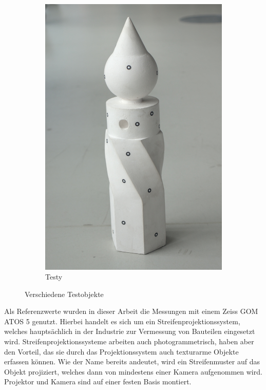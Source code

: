 \documentclass[./00PhotoBox.tex]{subfiles}
\begin{document}
\begin{figure}
\begin{subfigure}{0.32\textwidth}
        \includegraphics[width=1\textwidth]{img/7_versuche/bild_testy.jpg}
        \caption{Testy}
        \label{img:bild_testy}
    \end{subfigure}
    \caption{Verschiedene Testobjekte}
    \label{img:bilder_testobjekte}
\end{figure}

Als Referenzwerte wurden in dieser Arbeit die Messungen mit einem Zeiss GOM ATOS 5 genutzt. Hierbei handelt es sich um ein Streifenprojektionssystem, welches hauptsächlich in der Industrie zur Vermessung von Bauteilen eingesetzt wird. Streifenprojektionssysteme arbeiten auch photogrammetrisch, haben aber den Vorteil, das sie durch das Projektionssystem auch texturarme Objekte erfassen können. Wie der Name bereits andeutet, wird ein Streifenmuster auf das Objekt projiziert, welches dann von mindestens einer Kamera aufgenommen wird. Projektor und Kamera sind auf einer festen Basis montiert. \citep[vgl.][S. 581f]{luhmann}
\end{document}
